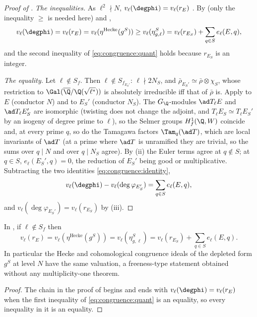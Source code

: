 \begin{proof}[Proof of ]
\emph{The inequalities.} As $\ell^2\nmid N$, $v_\ell(\degphi)=v_\ell(r_E)$ \cite[Theorem 2.2]{ARS12}. By  (only the inequality $\ge$ is needed here) and
,
\[
v_\ell(\degphi)=v_\ell(r_E)=v_\ell(\eta^{\mathrm{Hecke}}(g^S))\ge v_\ell(\eta^S_{g,\ell})=v_\ell(r_{E_S})+\sum_{q\in S}e_\ell(E,q),
\]
and the second inequality of \eqref{eq:congruence:quant} holds because $r_{E_S}$ is an integer.

\emph{The equality.} Let $\ell\notin S_f$. Then $\ell\notin S_{f_{E_S'}}$: $\ell\nmid2N_S$, and $\bar\rho_{E_S'}\simeq\bar\rho\otimes\chi_S$, whose restriction to $\Gal(\overline\Q/\Q(\sqrt{\ell^*}))$ is absolutely irreducible iff that of $\bar\rho$
is. Apply  to $E$ (conductor $N$) and to $E_S'$ (conductor $N_S$). The $G_\Q$-modules $\ad T_\ell E$ and $\ad T_\ell E_S'$ are isomorphic (twisting does not change the adjoint, and
$T_\ell E_S\simeq T_\ell E_S'$ by an isogeny of degree prime to $\ell$), so the Selmer groups $H^1_f(\Q,W)$ coincide and, at every prime $q$, so do the Tamagawa factors $\Tam_q(\ad T)$, which are local
invariants of $\ad T$ (at a prime where $\ad T$ is unramified they are trivial, so the sums over $q\mid N$ and over $q\mid N_S$ agree). By (ii) the Euler terms agree at
$q\notin S$; at $q\in S$, $e_\ell(E_S',q)=0$, the reduction of $E_S'$ being good or multiplicative. Subtracting the two identities \eqref{eq:congruence:identity},
\[
v_\ell(\degphi)-v_\ell(\deg\varphi_{E_S'})=\sum_{q\in S}e_\ell(E,q),
\]
and $v_\ell(\deg\varphi_{E_S'})=v_\ell(r_{E_S})$ by (iii).
\end{proof}

\begin{corollary}\label{cor:congruence:quant-equality}
In , if $\ell\notin S_f$ then
\[
v_\ell(r_E)=v_\ell(\eta^{\mathrm{Hecke}}(g^S))=v_\ell(\eta^S_{g,\ell})=v_\ell(r_{E_S})+\sum_{q\in S}e_\ell(E,q).
\]
In particular the Hecke and cohomological congruence ideals of the depleted form $g^S$ at level $N$ have the same valuation, a freeness-type statement obtained without any multiplicity-one
theorem.
\end{corollary}

\begin{proof}
The chain in the proof of  begins and ends with $v_\ell(\degphi)=v_\ell(r_E)$ when the first inequality of \eqref{eq:congruence:quant} is an equality, so every inequality in it is an
equality.
\end{proof}

